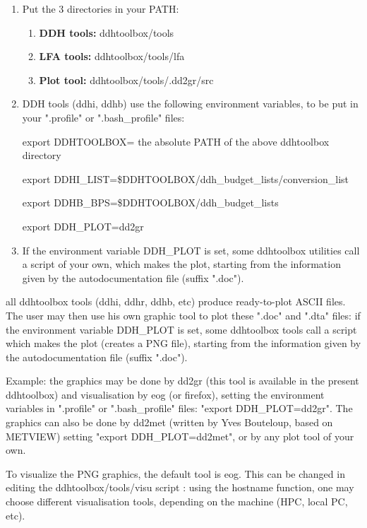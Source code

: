 \begin{enumerate}
  \item Put the 3 directories in your PATH:
    \begin{enumerate}
      \item {\bf DDH tools:} ddhtoolbox/tools
      \item {\bf LFA tools:} ddhtoolbox/tools/lfa
      \item {\bf Plot tool:} ddhtoolbox/tools/.dd2gr/src
    \end{enumerate}
  \item DDH tools (ddhi, ddhb) use the following environment variables, to be put in your ".profile" or ".bash\_profile" files:

    export DDHTOOLBOX= the absolute PATH of the above ddhtoolbox directory

    export DDHI\_LIST=\$DDHTOOLBOX/ddh\_budget\_lists/conversion\_list

    export DDHB\_BPS=\$DDHTOOLBOX/ddh\_budget\_lists

    export DDH\_PLOT=dd2gr


    \item \label{ddhplot} If the environment variable DDH\_PLOT is set, some ddhtoolbox utilities call a script of your own, which makes the plot, starting from the information given by the autodocumentation file (suffix ".doc").
\end{enumerate}

 all ddhtoolbox tools (ddhi, ddhr, ddhb, etc) produce ready-to-plot ASCII files. The user may then use his own graphic tool to plot these ".doc" and ".dta" files: if the environment variable DDH\_PLOT is set, some ddhtoolbox tools call a script which makes the plot (creates a PNG file), starting from the information given by the autodocumentation file (suffix ".doc").

\p Example: the graphics may be done by dd2gr (this tool is available in the present ddhtoolbox) and visualisation by eog (or firefox), setting the environment variables in ".profile" or ".bash\_profile" files: "export DDH\_PLOT=dd2gr". The graphics can also be done by dd2met (written by Yves Bouteloup, based on METVIEW) setting "export DDH\_PLOT=dd2met", or by any plot tool of your own.

\p To visualize the PNG graphics, the default tool is eog. This can be changed in editing the ddhtoolbox/tools/visu script : using the hostname function, one may choose different visualisation tools, depending on the machine (HPC, local PC, etc).

